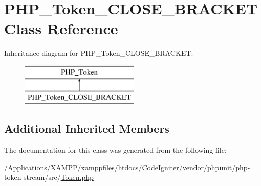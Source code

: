 \hypertarget{class_p_h_p___token___c_l_o_s_e___b_r_a_c_k_e_t}{}\section{P\+H\+P\+\_\+\+Token\+\_\+\+C\+L\+O\+S\+E\+\_\+\+B\+R\+A\+C\+K\+ET Class Reference}
\label{class_p_h_p___token___c_l_o_s_e___b_r_a_c_k_e_t}
Inheritance diagram for P\+H\+P\+\_\+\+Token\+\_\+\+C\+L\+O\+S\+E\+\_\+\+B\+R\+A\+C\+K\+ET\+:\begin{figure}[H]
\begin{center}
\leavevmode
\includegraphics[height=2.000000cm]{class_p_h_p___token___c_l_o_s_e___b_r_a_c_k_e_t}
\end{center}
\end{figure}
\subsection*{Additional Inherited Members}


The documentation for this class was generated from the following file\+:\begin{DoxyCompactItemize}
\item 
/\+Applications/\+X\+A\+M\+P\+P/xamppfiles/htdocs/\+Code\+Igniter/vendor/phpunit/php-\/token-\/stream/src/\mbox{\hyperlink{_token_8php}{Token.\+php}}\end{DoxyCompactItemize}

